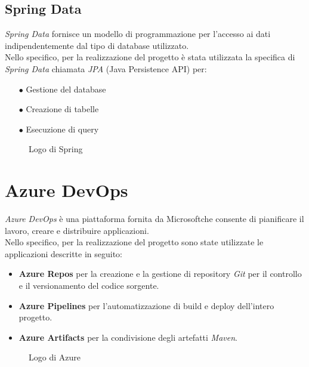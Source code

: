 \subsection{Spring Data}\label{sec:springdata}
\emph{Spring Data} fornisce un modello di programmazione per l'accesso ai dati indipendentemente dal tipo di database utilizzato. \cite{SpringData}\\
Nello specifico, per la realizzazione del progetto è stata utilizzata la specifica di \emph{Spring Data} chiamata \emph{JPA} \cite{SpringDataJPA} (Java Persistence API) per:
\begin{itemize}
	\item[$\bullet$]Gestione del database
	\item[$\bullet$]Creazione di tabelle
	\item[$\bullet$]Esecuzione di query
\end{itemize}

\begin{figure}[ht]
	\centering
	\caption{Logo di Spring}
	\label{fig:one}
\end{figure}


\section{Azure DevOps}\label{sec:azure}
\emph{Azure DevOps} è una piattaforma fornita da Microsoft\texttrademark  che consente di pianificare il lavoro, creare e distribuire applicazioni. \cite{Microsoft}\\
Nello specifico, per la realizzazione del progetto sono state utilizzate le applicazioni descritte in seguito:
\begin{itemize}
	\item \textbf{Azure Repos} per la creazione e la gestione di repository \emph{Git} per il controllo e il versionamento del codice sorgente.
	\item \textbf{Azure Pipelines} per l'automatizzazione di build e deploy dell'intero progetto.
	\item \textbf{Azure Artifacts} per la condivisione degli artefatti \emph{Maven}.
\end{itemize}
\begin{figure}[ht]
	\centering
	\caption{Logo di Azure}
	\label{fig:one}
\end{figure}

